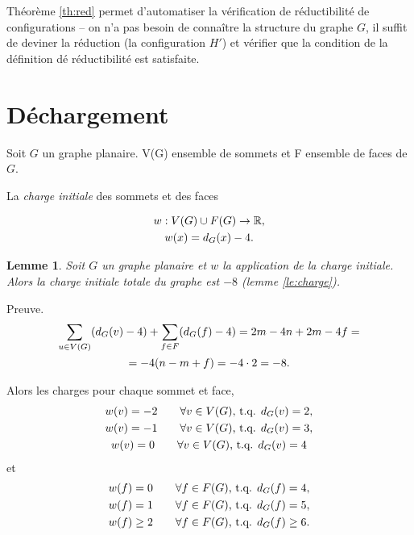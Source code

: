 \documentclass{beamer}
\newtheorem{lemme}{Lemme}
\begin{document}
\begin{frame}
Théorème \ref{th:red} permet d'automatiser la vérification de réductibilité de configurations -- on n'a pas besoin de connaître la structure du graphe $G$, il suffit de deviner la réduction (la configuration $H'$) et vérifier que la condition de la définition dé réductibilité est satisfaite.
\end{frame}

\section{Déchargement}
\begin{frame}
Soit $G$ un graphe planaire. V(G) ensemble de sommets et F ensemble de faces de $G$.

La \emph{charge initiale} des sommets et des faces

$$
\gathered
w: V(G)\cup F(G) \to \mathbb{R}, \\
w(x) = d_G(x) - 4. \\
\endgathered
$$
\end{frame}

\begin{frame}
\begin{lemme}
Soit $G$ un graphe planaire et $w$ la application de la charge initiale. Alors la charge initiale totale du graphe est $-8$ (lemme \ref{le:charge}).
\end{lemme}

Preuve.
$$
\gathered
\sum_{u \in V(G)} (d_G(v) - 4) + \sum_{f \in F} (d_G(f) - 4) = 2m - 4n + 2m - 4f =\\
= -4( n - m + f) = -4 \cdot 2 = -8.
\endgathered
$$
\end{frame}

\begin{frame}
Alors les charges pour chaque sommet et face,
$$
\gathered
w(v) = -2 \qquad \forall v \in V(G) \textrm{,  t.q.  } d_G(v) = 2,\\
w(v) = -1 \qquad \forall v \in V(G) \textrm{,  t.q.  } d_G(v) = 3,\\
w(v) = 0 \qquad \forall  v \in V(G) \textrm{,  t.q.  } d_G(v) = 4
\endgathered
$$
et
$$
\gathered
w(f) = 0 \qquad \forall f \in F(G) \textrm{,  t.q.  } d_G(f) = 4,\\
w(f) = 1 \qquad \forall f \in F(G) \textrm{,  t.q.  } d_G(f) = 5,\\
w(f) \geq 2 \qquad \forall f \in F(G) \textrm{, t.q.  } d_G(f) \geq 6.
\endgathered
$$
\end{frame}
\end{document}
